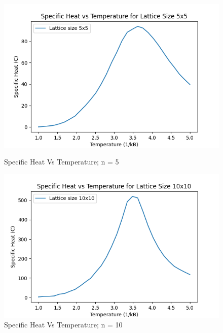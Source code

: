 \documentclass[11pt]{article}
\begin{document}
\begin{figure}[H]
    \centering
    \begin{minipage}{0.48\textwidth}
        \centering
        \includegraphics[width=\textwidth]{Specific_Heat_vs_Temperature_n5.png}
        \caption{Specific Heat Vs Temperature; n = 5}
        \label{fig:21}
    \end{minipage}\hfill %
    \begin{minipage}{0.48\textwidth}
        \centering
        \includegraphics[width=\textwidth]{Specific_Heat_vs_Temperature_n10.png}
        \caption{Specific Heat Vs Temperature; n = 10}
        \label{fig:22}
    \end{minipage}
\end{figure}
\end{document}
